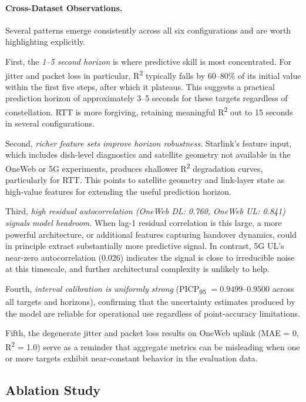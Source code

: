 \documentclass[12pt]{article}
\begin{document}
\paragraph{Cross-Dataset Observations.}
Several patterns emerge consistently across all six configurations and are worth highlighting explicitly.

First, the \emph{1--5 second horizon} is where predictive skill is most concentrated. For jitter and packet loss in particular, R\textsuperscript{2} typically falls by 60--80\% of its initial value within the first five steps, after which it plateaus. This suggests a practical prediction horizon of approximately 3--5 seconds for these targets regardless of constellation. RTT is more forgiving, retaining meaningful R\textsuperscript{2} out to 15 seconds in several configurations.

Second, \emph{richer feature sets improve horizon robustness.} Starlink's feature input, which includes dish-level diagnostics and satellite geometry not available in the OneWeb or 5G experiments, produces shallower R\textsuperscript{2} degradation curves, particularly for RTT. This points to satellite geometry and link-layer state as high-value features for extending the useful prediction horizon.

Third, \emph{high residual autocorrelation (OneWeb DL: 0.760, OneWeb UL: 0.841) signals model headroom}. When lag-1 residual correlation is this large, a more powerful architecture, or additional features capturing handover dynamics, could in principle extract substantially more predictive signal. In contrast, 5G UL's near-zero autocorrelation (0.026) indicates the signal is close to irreducible noise at this timescale, and further architectural complexity is unlikely to help.

Fourth, \emph{interval calibration is uniformly strong} (PICP\textsubscript{95} $= 0.9499$--$0.9500$ across all targets and horizons), confirming that the uncertainty estimates produced by the model are reliable for operational use regardless of point-accuracy limitations.

Fifth, the degenerate jitter and packet loss results on OneWeb uplink (MAE = 0, R\textsuperscript{2} = 1.0) serve as a reminder that aggregate metrics can be misleading when one or more targets exhibit near-constant behavior in the evaluation data.

\subsection{Ablation Study}
\end{document}

